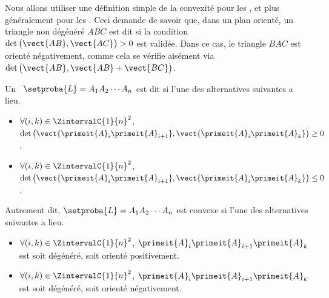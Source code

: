 Nous allons utiliser une définition simple de la convexité pour les \ngones, et plus généralement pour les \ncycles. Ceci demande de savoir que, dans un plan orienté, un triangle non dégénéré $ABC$ est dit  si la condition $\det \big( \vect{AB} , \vect{AC} \big) > 0$ est validée. Dans ce cas, le triangle $BAC$ est orienté négativement, comme cela se vérifie aisément via $\det \big( \vect{AB} , \vect{AB} + \vect{BC} \big)$.




\begin{defi} \label{ncycle-def}
    Un \ncycle\ $\setproba{L} = A_1 A_2 \cdots A_n$ est dit  si  l'une des alternatives suivantes a lieu.
    \begin{itemize}
        \item $\forall (i, k) \in \ZintervalC{1}{n}^2$,
        $\det \big( \vect{\primeit{A}_i \primeit{A}_{i+1}}, \vect{\primeit{A}_i \primeit{A}_k} \big) \geq 0$.

        \item $\forall (i, k) \in \ZintervalC{1}{n}^2$,
        $\det \big( \vect{\primeit{A}_i \primeit{A}_{i+1}}, \vect{\primeit{A}_i \primeit{A}_k} \big) \leq 0$.
    \end{itemize}

    Autrement dit, $\setproba{L} = A_1 A_2 \cdots A_n$ est convexe si l'une des alternatives suivantes a lieu.
    \begin{itemize}
        \item $\forall (i, k) \in \ZintervalC{1}{n}^2$,
        $\primeit{A}_i \primeit{A}_{i+1} \primeit{A}_k$ est soit dégénéré, soit  orienté positivement.

        \item $\forall (i, k) \in \ZintervalC{1}{n}^2$,
        $\primeit{A}_i \primeit{A}_{i+1} \primeit{A}_k$ est soit dégénéré, soit  orienté négativement.
    \end{itemize}
\end{defi}


